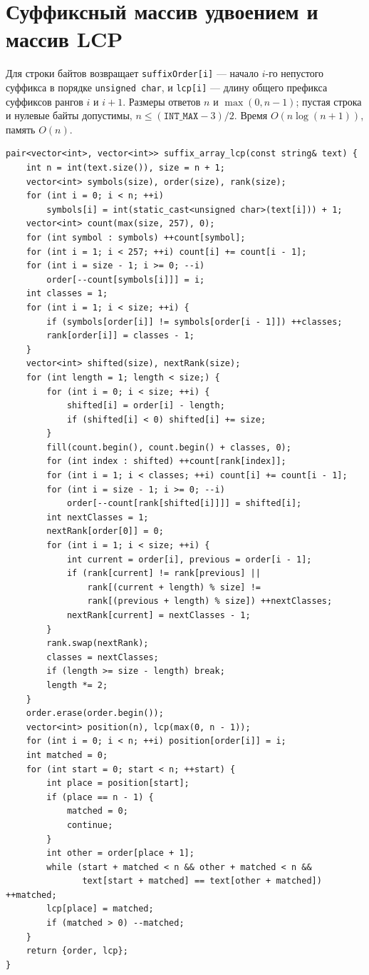 \section{Суффиксный массив удвоением и массив LCP}
Для строки байтов возвращает \texttt{suffixOrder[i]} --- начало $i$-го непустого суффикса в порядке \texttt{unsigned char}, и \texttt{lcp[i]} --- длину общего префикса суффиксов рангов $i$ и $i+1$.
Размеры ответов $n$ и $\max(0,n-1)$; пустая строка и нулевые байты допустимы, $n\le(\texttt{INT\_MAX}-3)/2$.
Время $O(n\log(n+1))$, память $O(n)$.
\begin{lstlisting}[name=extra_string_suffix_array]
pair<vector<int>, vector<int>> suffix_array_lcp(const string& text) {
    int n = int(text.size()), size = n + 1;
    vector<int> symbols(size), order(size), rank(size);
    for (int i = 0; i < n; ++i)
        symbols[i] = int(static_cast<unsigned char>(text[i])) + 1;
    vector<int> count(max(size, 257), 0);
    for (int symbol : symbols) ++count[symbol];
    for (int i = 1; i < 257; ++i) count[i] += count[i - 1];
    for (int i = size - 1; i >= 0; --i)
        order[--count[symbols[i]]] = i;
    int classes = 1;
    for (int i = 1; i < size; ++i) {
        if (symbols[order[i]] != symbols[order[i - 1]]) ++classes;
        rank[order[i]] = classes - 1;
    }
    vector<int> shifted(size), nextRank(size);
    for (int length = 1; length < size;) {
        for (int i = 0; i < size; ++i) {
            shifted[i] = order[i] - length;
            if (shifted[i] < 0) shifted[i] += size;
        }
        fill(count.begin(), count.begin() + classes, 0);
        for (int index : shifted) ++count[rank[index]];
        for (int i = 1; i < classes; ++i) count[i] += count[i - 1];
        for (int i = size - 1; i >= 0; --i)
            order[--count[rank[shifted[i]]]] = shifted[i];
        int nextClasses = 1;
        nextRank[order[0]] = 0;
        for (int i = 1; i < size; ++i) {
            int current = order[i], previous = order[i - 1];
            if (rank[current] != rank[previous] ||
                rank[(current + length) % size] !=
                rank[(previous + length) % size]) ++nextClasses;
            nextRank[current] = nextClasses - 1;
        }
        rank.swap(nextRank);
        classes = nextClasses;
        if (length >= size - length) break;
        length *= 2;
    }
    order.erase(order.begin());
    vector<int> position(n), lcp(max(0, n - 1));
    for (int i = 0; i < n; ++i) position[order[i]] = i;
    int matched = 0;
    for (int start = 0; start < n; ++start) {
        int place = position[start];
        if (place == n - 1) {
            matched = 0;
            continue;
        }
        int other = order[place + 1];
        while (start + matched < n && other + matched < n &&
               text[start + matched] == text[other + matched]) ++matched;
        lcp[place] = matched;
        if (matched > 0) --matched;
    }
    return {order, lcp};
}
\end{lstlisting}
